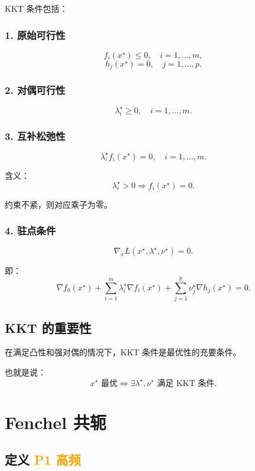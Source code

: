 \documentclass[11pt,a4paper]{ctexart}
\newcommand{\Pone}{\textcolor{orange}{\textbf{P1 高频}}}
\theoremstyle{definition}
\theoremstyle{plain}
\theoremstyle{remark}
\begin{document}
KKT 条件包括：

\subsubsection*{1. 原始可行性}

\[
    f_i(x^\star)\le0,\quad i=1,\dots,m,
\]
\[
    h_j(x^\star)=0,\quad j=1,\dots,p.
\]

\subsubsection*{2. 对偶可行性}

\[
    \lambda_i^\star\ge0,\quad i=1,\dots,m.
\]

\subsubsection*{3. 互补松弛性}

\[
    \lambda_i^\star f_i(x^\star)=0,
    \quad i=1,\dots,m.
\]

含义：
\[
    \lambda_i^\star>0 \Rightarrow f_i(x^\star)=0.
\]

约束不紧，则对应乘子为零。

\subsubsection*{4. 驻点条件}

\[
    \nabla_x L(x^\star,\lambda^\star,\nu^\star)=0.
\]

即：
\[
    \nabla f_0(x^\star)
    +
    \sum_{i=1}^m \lambda_i^\star \nabla f_i(x^\star)
    +
    \sum_{j=1}^p \nu_j^\star \nabla h_j(x^\star)
    =
    0.
\]

\subsection{KKT 的重要性}

在满足凸性和强对偶的情况下，KKT 条件是最优性的充要条件。

也就是说：
\[
    x^\star \text{ 最优}
    \Longleftrightarrow
    \exists \lambda^\star,\nu^\star
    \text{ 满足 KKT 条件}.
\]

\section{Fenchel 共轭}

\subsection{定义 \Pone}
\end{document}
